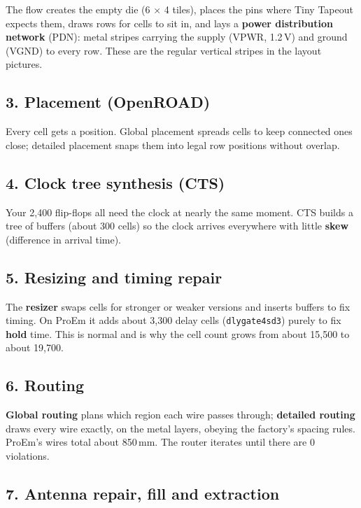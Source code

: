 \documentclass[11pt,a4paper]{article}
\begin{document}
The flow creates the empty die (6 $\times$ 4 tiles), places the pins where Tiny Tapeout expects them, draws rows for cells to sit in, and lays a \textbf{power distribution network} (PDN): metal stripes carrying the supply (VPWR, 1.2\,V) and ground (VGND) to every row. These are the regular vertical stripes in the layout pictures.

\subsection{3. Placement (OpenROAD)}

Every cell gets a position. Global placement spreads cells to keep connected ones close; detailed placement snaps them into legal row positions without overlap.

\subsection{4. Clock tree synthesis (CTS)}

Your 2,400 flip-flops all need the clock at nearly the same moment. CTS builds a tree of buffers (about 300 cells) so the clock arrives everywhere with little \textbf{skew} (difference in arrival time).

\subsection{5. Resizing and timing repair}

The \textbf{resizer} swaps cells for stronger or weaker versions and inserts buffers to fix timing. On ProEm it adds about 3,300 delay cells (\texttt{dlygate4sd3}) purely to fix \textbf{hold} time. This is normal and is why the cell count grows from about 15,500 to about 19,700.

\subsection{6. Routing}

\textbf{Global routing} plans which region each wire passes through; \textbf{detailed routing} draws every wire exactly, on the metal layers, obeying the factory's spacing rules. ProEm's wires total about 850\,mm. The router iterates until there are 0 violations.

\subsection{7. Antenna repair, fill and extraction}
\end{document}
